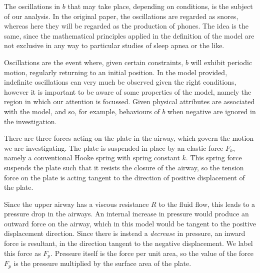 
The oscillations in $b$ that may take place, depending on conditions, is the subject of our analysis.
In the original paper, the oscillations are regarded as snores,
whereas here they will be regarded as the production of phones.
The idea is the same, since the mathematical principles applied in the definition of the model are not exclusive in any way to particular studies of sleep apnea or the like.

Oscillations are the event where, given certain constraints, $b$ will exhibit periodic motion, regularly returning to an initial position. %
In the model provided, indefinite oscillations can very much be observed given the right conditions,
however it is important to be aware of some properties of the model,
namely the region in which our attention is focussed. Given physical attributes are associated with the model,
and so, for example, behaviours of $b$ when negative are ignored in the investigation.

There are three forces acting on the plate in the airway, which govern the motion we are investigating.
The plate is suspended in place by an elastic force $F_k$, namely a conventional Hooke spring with spring constant $k$.
This spring force suspends the plate such that it resists the closure of the airway,
so the tension force on the plate is acting tangent to the direction of positive displacement of the plate.


Since the upper airway has a viscous resistance $R$ to the fluid flow,
this leads to a pressure drop in the airways. %
An internal increase in pressure would produce an outward force on the airway,
which in this model would be tangent to the positive displacement direction.
Since there is instead a \textit{decrease} in pressure, an inward force is resultant,
in the direction tangent to the negative displacement. We label this force as $F_p$.
Pressure itself is the force per unit area,
so the value of the force $F_p$ is the pressure multiplied by the surface area of the plate.

